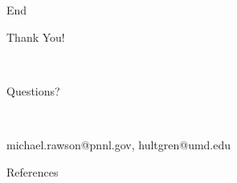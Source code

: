 \documentclass{beamer}
\begin{document}
\begin{frame}{End}
\begin{center}    
    Thank You!
    
    ~
    
    Questions?

    ~

    michael.rawson@pnnl.gov, hultgren@umd.edu
    
\end{center}

\end{frame}

\begin{frame}{References}
\tiny
    
    
\end{frame}
\end{document}
